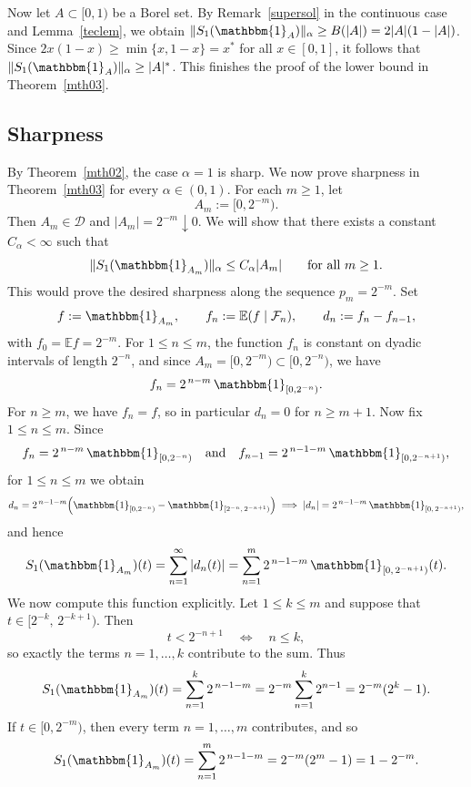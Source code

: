 \documentclass[11pt]{amsart}
\theoremstyle{definition}
\renewcommand{\1}{{\mathbbm{1}}}
\begin{document}
Now let $A\subset{[0,1)}$ be a Borel set. By Remark~\ref{supersol} in the continuous case and Lemma~\ref{teclem}, we obtain $\|S_1(\mathbbm{1}_{A})\|_{\alpha} \geq B(|A|)=2|A|(1-|A|)$. Since $2x(1-x)\geq \min\{x,1-x\}=x^{*}$ for all $x\in[0,1]$, it follows that $\|S_1(\mathbbm{1}_{A})\|_{\alpha} \geq |A|^*$. This finishes the proof of the lower bound in Theorem~\ref{mth03}.












\subsection{Sharpness}

By Theorem~\ref{mth02}, the case $\alpha=1$ is sharp. We now prove 
sharpness in Theorem~\ref{mth03} for every $\alpha\in(0,1)$.
For each $m\ge 1$, let
\[
A_m:=[0,2^{-m}).
\]
Then $A_m\in\mathcal D$ and
$|A_m|=2^{-m}\downarrow 0.$
We will show that there exists a constant $C_\alpha<\infty$ such that
\[
\|S_1(\mathbbm{1}_{A_m})\|_\alpha \le C_\alpha |A_m|
\qquad \text{for all } m\ge 1.
\]
This would prove the desired sharpness along the sequence $p_m=2^{-m}$.
Set
\[
f:=\mathbbm{1}_{A_m},
\qquad
f_n:=\mathbb E(f\mid \mathcal F_n),
\qquad
d_n:=f_n-f_{n-1},
\]
with $f_0=\mathbb E f = 2^{-m}$.
For $1\le n\le m$, the function $f_n$ is constant on dyadic intervals of length
$2^{-n}$, and since $A_m=[0,2^{-m})\subset[0,2^{-n})$, we have
\[
f_n=2^{\,n-m}\,\mathbbm{1}_{[0,2^{-n})}.
\]
For $n\ge m$, we have $f_n=f$, so in particular $d_n=0$ for $n\ge m+1$.
Now fix $1\le n\le m$. Since
\[
f_n=2^{\,n-m}\,\mathbbm{1}_{[0,2^{-n})}
\quad\text{and}\quad
f_{n-1}=2^{\,n-1-m}\,\mathbbm{1}_{[0,2^{-n+1})},
\]
for $ 1\le n\le m$ we obtain
\[
d_n
=
2^{\,n-1-m}
\Bigl(
\mathbbm{1}_{[0,2^{-n})}
-
\mathbbm{1}_{[2^{-n},\,2^{-n+1})}
\Bigr)
\implies
|d_n|
=
2^{\,n-1-m}\,\mathbbm{1}_{[0,\,2^{-n+1})},
\]
and hence
\[
S_1(\mathbbm{1}_{A_m})(t)
=
\sum_{n=1}^\infty |d_n(t)|
=
\sum_{n=1}^m 2^{\,n-1-m}\,\mathbbm{1}_{[0,\,2^{-n+1})}(t).
\]
We now compute this function explicitly. Let $1\le k\le m$ and suppose that
$t\in [2^{-k},\,2^{-k+1}).$
Then
\[
t<2^{-n+1}
\quad\Longleftrightarrow\quad
n\le k,
\]
so exactly the terms $n=1,\dots,k$ contribute to the sum. Thus
\[
S_1(\mathbbm{1}_{A_m})(t)
=
\sum_{n=1}^k 2^{\,n-1-m}
=
2^{-m}\sum_{n=1}^k 2^{n-1}
=
2^{-m}(2^k-1).
\]
If $t\in[0,2^{-m})$, then every term $n=1,\dots,m$
contributes, and so
\[
S_1(\mathbbm{1}_{A_m})(t)
=
\sum_{n=1}^m 2^{\,n-1-m}
=
2^{-m}(2^m-1)
=
1-2^{-m}.
\]
\end{document}
